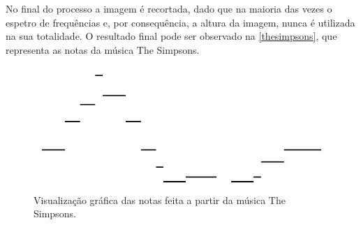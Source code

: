 No final do processo a imagem é recortada, dado que na maioria das vezes o espetro de frequências e, por consequência, a altura da imagem, nunca é utilizada na sua totalidade. O resultado final pode ser observado na \autoref{thesimpsons}, que representa as notas da música The Simpsons.

\begin{figure}[htp]
\centering
\includegraphics[width=\textwidth]{images/thesimpsons.jpg}
\caption{Visualização gráfica das notas feita a partir da música The Simpsons.}
\label{thesimpsons}
\end{figure}
